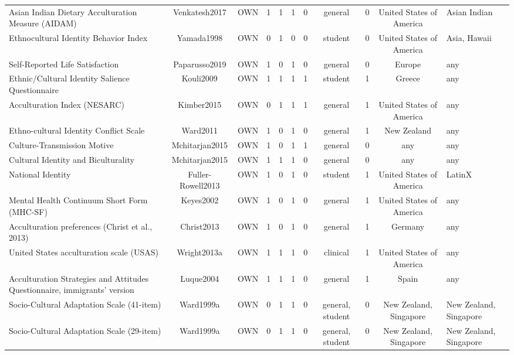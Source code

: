 \begin{longtable}[l]{lclclclclcl}
Asian Indian Dietary Acculturation Measure (AIDAM) & Venkatesh2017 & OWN & 1 & 1 & 1 & 0 & general & 0 & United States of America & Asian Indian\\
Ethnocultural Identity Behavior Index & Yamada1998 & OWN & 0 & 1 & 0 & 0 & student & 0 & United States of America & Asia, Hawaii\\
Self-Reported Life Satisfaction & Paparusso2019 & OWN & 1 & 0 & 1 & 0 & general & 0 & Europe & any\\
Ethnic/Cultural Identity Salience Questionnaire & Kouli2009 & OWN & 1 & 1 & 1 & 1 & student & 1 & Greece & any\\
Acculturation Index (NESARC) & Kimber2015 & OWN & 0 & 1 & 1 & 1 & general & 1 & United States of America & any\\
Ethno-cultural Identity Conflict Scale & Ward2011 & OWN & 1 & 0 & 1 & 0 & general & 1 & New Zealand & any\\
Culture-Transmission Motive & Mchitarjan2015 & OWN & 1 & 0 & 1 & 1 & general & 0 & any & any\\
Cultural Identity and Biculturality & Mchitarjan2015 & OWN & 1 & 1 & 1 & 0 & general & 0 & any & any\\
National Identity & Fuller-Rowell2013 & OWN & 1 & 0 & 1 & 0 & student & 1 & United States of America & LatinX\\
Mental Health Continuum Short Form (MHC-SF) & Keyes2002 & OWN & 1 & 0 & 1 & 0 & general & 1 & United States of America & any\\
Acculturation preferences (Christ et al., 2013) & Christ2013 & OWN & 1 & 0 & 1 & 0 & general & 1 & Germany & any\\
United States acculturation scale (USAS) & Wright2013a & OWN & 1 & 1 & 1 & 0 & clinical & 1 & United States of America & any\\
Acculturation Strategies and Attitudes Questionnaire, immigrants’ version & Luque2004 & OWN & 1 & 1 & 1 & 0 & general & 1 & Spain & any\\
Socio-Cultural Adaptation Scale (41-item) & Ward1999a & OWN & 0 & 1 & 1 & 0 & general, student & 0 & New Zealand, Singapore & New Zealand, Singapore\\
Socio-Cultural Adaptation Scale (29-item) & Ward1999a & OWN & 0 & 1 & 1 & 0 & general, student & 0 & New Zealand, Singapore & New Zealand, Singapore\\*
\end{longtable}
